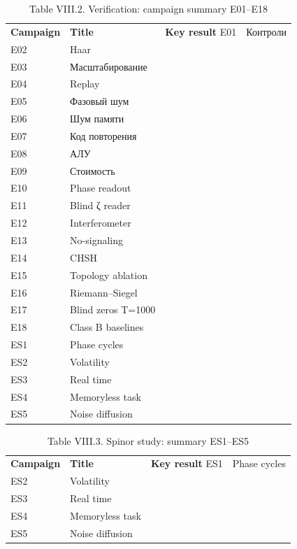 \documentclass[11pt,a4paper]{article}
\begin{document}
\begin{table}[htbp]\centering\small
\caption{Table VIII.2. Verification: campaign summary E01–E18}
\begin{tabular}{p{} p{} p{}}
\toprule
\textbf{Campaign} & \textbf{Title} & \textbf{Key result}
\midrule
E01 & Контроли &  \\
E02 & Haar &  \\
E03 & Масштабирование &  \\
E04 & Replay &  \\
E05 & Фазовый шум &  \\
E06 & Шум памяти &  \\
E07 & Код повторения &  \\
E08 & АЛУ &  \\
E09 & Стоимость &  \\
E10 & Phase readout &  \\
E11 & Blind ζ reader &  \\
E12 & Interferometer &  \\
E13 & No-signaling &  \\
E14 & CHSH &  \\
E15 & Topology ablation &  \\
E16 & Riemann–Siegel &  \\
E17 & Blind zeros T=1000 &  \\
E18 & Class B baselines &  \\
ES1 & Phase cycles &  \\
ES2 & Volatility &  \\
ES3 & Real time &  \\
ES4 & Memoryless task &  \\
ES5 & Noise diffusion &  \\
\bottomrule
\end{tabular}
\end{table}

\begin{table}[htbp]\centering\small
\caption{Table VIII.3. Spinor study: summary ES1–ES5}
\begin{tabular}{p{} p{} p{}}
\toprule
\textbf{Campaign} & \textbf{Title} & \textbf{Key result}
\midrule
ES1 & Phase cycles &  \\
ES2 & Volatility &  \\
ES3 & Real time &  \\
ES4 & Memoryless task &  \\
ES5 & Noise diffusion &  \\
\bottomrule
\end{tabular}
\end{table}
\end{document}
